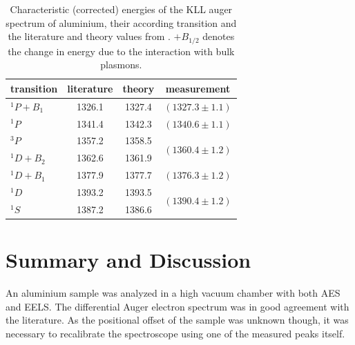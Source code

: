 \documentclass[a4paper]{scrartcl}
\numberwithin{equation}{section}
\numberwithin{figure}{section}
\numberwithin{table}{section}
\begin{document}
\begin{table}[!h]
\centering
\begin{tabular}{lccc}
\toprule
transition & literature & theory & measurement \\
\midrule
$^1P + B_1$ & 1326.1 & 1327.4 & $(1327.3\pm 1.1)$  \\
\midrule
$^1P$ 		& 1341.4 & 1342.3 & $(1340.6\pm 1.1)$ \\
\midrule
$^3P$ 		& 1357.2 & 1358.5 & \multirow{2}{*}{$(1360.4\pm 1.2)$}  \\
$^1D + B_2$ & 1362.6 & 1361.9 & \\
\midrule
$^1D + B_1$ & 1377.9 & 1377.7 & $(1376.3\pm 1.2)$ \\
\midrule
$^1D$ 		& 1393.2 & 1393.5 & \multirow{2}{*}{$(1390.4\pm 1.2)$}  \\
$^1S$ 	   & 1387.2 & 1386.6 & \\
 \bottomrule
\end{tabular}

\caption{\small Characteristic (corrected) energies of the KLL auger spectrum of aluminium, their according transition and the literature and theory values from \cite{paper}. $+B_{1/2}$ denotes the change in energy due to the interaction with bulk plasmons. }

\label{A}
\end{table}


\FloatBarrier
\section{Summary and Discussion}
An aluminium sample was analyzed in a high vacuum chamber with both AES and EELS. The differential Auger electron spectrum was in good agreement with the literature. As the positional offset of the sample was unknown though, it was necessary to recalibrate the spectroscope using one of the measured peaks itself.
\end{document}
